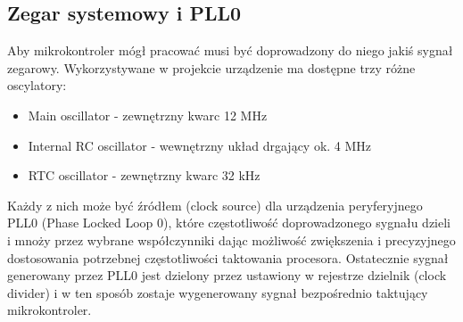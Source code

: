 \subsection{Zegar systemowy i PLL0} \label{system_clock}

Aby mikrokontroler mógł pracować musi być doprowadzony do niego jakiś sygnał zegarowy. Wykorzystywane w projekcie urządzenie ma dostępne trzy różne oscylatory:
\begin{itemize}
    \item Main oscillator - zewnętrzny kwarc 12 MHz
    \item Internal RC oscillator - wewnętrzny układ drgający ok. 4 MHz
    \item RTC oscillator - zewnętrzny kwarc 32 kHz
\end{itemize}
Każdy z nich może być źródłem (clock source) dla urządzenia peryferyjnego PLL0 (Phase Locked Loop 0), które częstotliwość doprowadzonego sygnału dzieli i mnoży przez wybrane współczynniki dając możliwość zwiększenia i precyzyjnego dostosowania potrzebnej częstotliwości taktowania procesora. Ostatecznie sygnał generowany przez PLL0 jest dzielony przez ustawiony w rejestrze dzielnik (clock divider) i w ten sposób zostaje wygenerowany sygnał bezpośrednio taktujący mikrokontroler.

